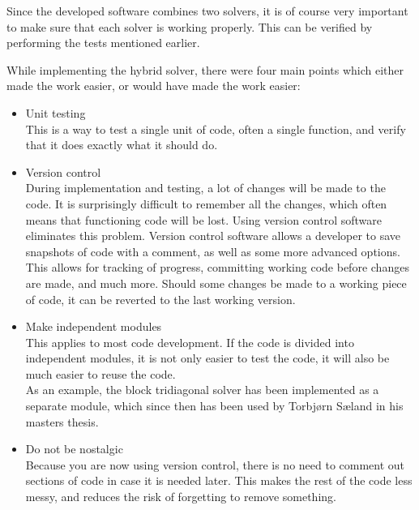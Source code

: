 Since the developed software combines two solvers, it is of course very important to make sure that each solver is working properly. 
This can be verified by performing the tests mentioned earlier. 

While implementing the hybrid solver, there were four main points which either made the work easier, or would have made the work easier:

\begin{itemize}
 \item Unit testing\\
 This is a way to test a single unit of code, often a single function, and verify that it does exactly what it should do. \\
 \item Version control\\
 During implementation and testing, a lot of changes will be made to the code. It is surprisingly difficult to remember all the changes, which often means that functioning code will be lost. 
 Using version control software eliminates this problem. Version control software allows a developer to save snapshots of code with a comment, as well as some more advanced options. This allows for tracking of progress, committing working code before changes are made, and much more. Should some changes be made to a working piece of code, it can be reverted to the last working version.\\
 \item Make independent modules\\
 This applies to most code development. If the code is divided into independent modules, it is not only easier to test the code, it will also be much easier to reuse the code. \\
 As an example, the block tridiagonal solver has been implemented as a separate module, which since then has been used by Torbjørn Sæland in his masters thesis.\\
 \item Do not be nostalgic\\
 Because you are now using version control, there is no need to comment out sections of code in case it is needed later. 
 This makes the rest of the code less messy, and reduces the risk of forgetting to remove something.
\end{itemize}

